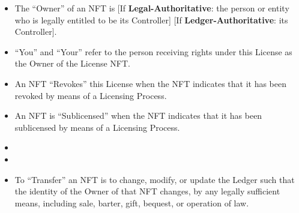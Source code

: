 \documentclass{article}
\newcommand{\keyword}[1]{\textbf{#1}\xspace}
\newcommand{\sharealike}{\keyword{Share-Alike}}
\newcommand{\derivativetracking}{\keyword{Derivative-Tracking}}
\newcommand{\ledger}{\keyword{Ledger-Authoritative}}
\newcommand{\legal}{\keyword{Legal-Authoritative}}
\newcommand{\subsect}[1]{\vspace{12pt}\noindent{\em{#1}}}
\newcommand{\iflicenseoption}[2]{[\colorbox{light-gray}{If #1:} #2]}
\begin{document}
\begin{sffamily}
	\subsect{Ownership and Transfers}

	\begin{itemize}
	
	\item	 The ``Owner'' of an NFT is \iflicenseoption{\legal}{the person or entity who is legally entitled to be its Controller} \iflicenseoption{\ledger}{its Controller}.
		
	\item	``You'' and ``Your'' refer to the person receiving rights under this License as the Owner of the License NFT.

	\item	An NFT ``Revokes'' this License when the NFT indicates that it has been revoked by means of a Licensing Process.

	\item	An NFT is ``Sublicensed'' when the NFT indicates that it has been sublicensed by means of a Licensing Process.

	\item 	\iflicenseoption{\derivativetracking}{Adapted Material is ``Derivative Tracked'' from an NFT (the ``Parent NFT'') when the Parent NFT is Sublicensed by means of a Licensing Process that (1) creates another NFT (the ``Child NFT'') on the same Ledger as the Parent NFT, (2) causes the Child NFT to be Linked to Adapted Material, and (3) causes the Child NFT and Parent NFT to have materially the same properties and functionality, except for the identity of the parties they are Associated with and the identity of the material they are Linked to.}

	\item 	\iflicenseoption{\sharealike}{Adapted Material is ``Share-Alike Sublicensed'' from an NFT (the ``Parent NFT'') when the Parent NFT is Sublicensed by means of a Licensing Process that (1) creates another NFT (the ``Child NFT'') on the same Ledger as the Parent NFT, (2) causes the Child NFT to be Linked to Adapted Material, (3) causes the Child NFT and Parent NFT to have materially the same properties and functionality, except for the identity of the parties they are Associated with and the identity of the material they are Linked to, and (4) causes the Child NFT to Invoke this license.}

	\item	To ``Transfer'' an NFT is to change, modify, or update the Ledger such that the identity of the Owner of that NFT changes, by any legally sufficient means, including sale, barter, gift, bequest, or operation of law. 
		

\end{itemize}
\end{sffamily}
\end{document}
